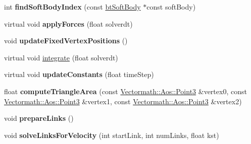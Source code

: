 \begin{DoxyCompactItemize}
\item 
\hypertarget{classbt_open_c_l_soft_body_solver_ab9279cc2d59f750669cfdb1169cfd72d}{int {\bfseries find\+Soft\+Body\+Index} (const \hyperlink{classbt_soft_body}{bt\+Soft\+Body} $\ast$const soft\+Body)}\label{classbt_open_c_l_soft_body_solver_ab9279cc2d59f750669cfdb1169cfd72d}

\item 
\hypertarget{classbt_open_c_l_soft_body_solver_af4eb320227e2c64215d1f9e81e8f4f6c}{virtual void {\bfseries apply\+Forces} (float solverdt)}\label{classbt_open_c_l_soft_body_solver_af4eb320227e2c64215d1f9e81e8f4f6c}

\item 
\hypertarget{classbt_open_c_l_soft_body_solver_a8ebe65eba18e313891c8b7d9894f1a07}{void {\bfseries update\+Fixed\+Vertex\+Positions} ()}\label{classbt_open_c_l_soft_body_solver_a8ebe65eba18e313891c8b7d9894f1a07}

\item 
virtual void \hyperlink{classbt_open_c_l_soft_body_solver_ad52983f1059032ef7f89416442cc911c}{integrate} (float solverdt)
\item 
\hypertarget{classbt_open_c_l_soft_body_solver_a9533c30551e72b99ebf7327b8001cf3e}{virtual void {\bfseries update\+Constants} (float time\+Step)}\label{classbt_open_c_l_soft_body_solver_a9533c30551e72b99ebf7327b8001cf3e}

\item 
\hypertarget{classbt_open_c_l_soft_body_solver_af5a6006337ca96e942876b52be7b7763}{float {\bfseries compute\+Triangle\+Area} (const \hyperlink{class_vectormath_1_1_aos_1_1_point3}{Vectormath\+::\+Aos\+::\+Point3} \&vertex0, const \hyperlink{class_vectormath_1_1_aos_1_1_point3}{Vectormath\+::\+Aos\+::\+Point3} \&vertex1, const \hyperlink{class_vectormath_1_1_aos_1_1_point3}{Vectormath\+::\+Aos\+::\+Point3} \&vertex2)}\label{classbt_open_c_l_soft_body_solver_af5a6006337ca96e942876b52be7b7763}

\item 
\hypertarget{classbt_open_c_l_soft_body_solver_aed3065d7877dc780cf89fcf777d255ba}{void {\bfseries prepare\+Links} ()}\label{classbt_open_c_l_soft_body_solver_aed3065d7877dc780cf89fcf777d255ba}

\item 
\hypertarget{classbt_open_c_l_soft_body_solver_ac1a2fbaa31b4caa8c5ff362f6d0b3473}{void {\bfseries solve\+Links\+For\+Velocity} (int start\+Link, int num\+Links, float kst)}\label{classbt_open_c_l_soft_body_solver_ac1a2fbaa31b4caa8c5ff362f6d0b3473}


\end{DoxyCompactItemize}
